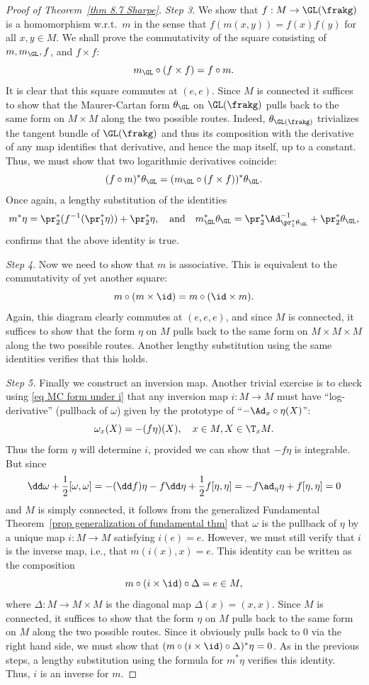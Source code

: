 \begin{proof}[Proof of Theorem~\ref{thm 8.7 Sharpe}]
    \emph{Step 3.} We show that $f:M\to \GL(\frakg)$ is a homomorphism w.r.t.\ $m$ in the sense that $f(m(x,y))=f(x)f(y)$ for all $x,y\in M$. We shall prove the commutativity of the square consisting of $m,m_{\GL},f$, and $f\times f$:
    \[m_{\GL}\circ (f\times f)=f\circ m.\]
    It is clear that this square commutes at $(e,e)$. Since $M$ is connected it suffices to show that the Maurer-Cartan form $\theta_{\GL}$ on $\GL(\frakg)$ pulls back to the same form on $M\times M$ along the two possible routes. Indeed, $\theta_{\GL(\frakg)}$ trivializes the tangent bundle of $\GL(\frakg)$ and thus its composition with the derivative of any map identifies that derivative, and hence the map itself, up to a constant. Thus, we must show that two logarithmic derivatives coincide:
    \[(f\circ m)^\ast\theta_{\GL}=(m_{\GL}\circ (f\times f))^\ast \theta_{\GL}.\]
    Once again, a lengthy substitution of the identities
    \[m^\ast\eta=\pr_2^\ast(f^{-1}(\pr_1^\ast\eta))+\pr_2^\ast\eta, \quad \text{and}\quad m_{\GL}^\ast\theta_{\GL}=\pr_2^\ast \Ad^{-1}_{\pr_1^\ast\theta_{\GL}}+\pr_2^\ast \theta_{\GL},\] confirms that the above identity is true.

    \emph{Step 4}. Now we need to show that $m$ is associative. This is equivalent to the commutativity of yet another square:
    \[m\circ (m\times \id)=m\circ (\id\times m).\]
    Again, this diagram clearly commutes at $(e,e,e)$, and since $M$ is connected, it suffices to show that the form $\eta$ on $M$ pulls back to the same form on $M\times M\times M$ along the two possible routes. Another lengthy substitution using the same identities verifies that this holds.

    \emph{Step 5.} Finally we construct an inversion map. Another trivial exercise is to check using \eqref{eq MC form under i} that any inversion map $i:M\to M$ must have ``log-derivative'' (pullback of $\omega$) given by the prototype of ``$-\Ad_x\circ \eta(X)$'':
    \[\omega_x(X)=-(f\eta)(X),\quad x\in M,X\in \T_x M.\]
    Thus the form $\eta$ will determine $i$, provided we can show that $-f\eta$ is integrable. But since
    \[\dd\omega+\frac12[\omega,\omega]=-(\dd f)\eta -f\dd \eta+\frac12 f[\eta,\eta]=-f\ad_\eta\eta +f[\eta,\eta]=0\]
    and $M$ is simply connected, it follows from the generalized Fundamental Theorem~\ref{prop generalization of fundamental thm} that $\omega$ is the pullback of $\eta$ by a unique map $i:M\to M$ satisfying $i(e)=e$. However, we must still verify that $i$ is the inverse map, i.e., that $m(i(x),x)=e$. This identity can be written as the composition
    \[m\circ(i\times\id)\circ\Delta=e\in M,\]
    where $\Delta:M\to M\times M$ is the diagonal map $\Delta(x)=(x,x)$. Since $M$ is connected, it suffices to show that the form $\eta$ on $M$ pulls back to the same form on $M$ along the two possible routes. Since it obviously pulls back to $0$ via the right hand side, we must show that $(m\circ(i\times\id)\circ\Delta)^\ast\eta=0$. As in the previous steps, a lengthy substitution using the formula for $m^\ast\eta$ verifies this identity. Thus, $i$ is an inverse for $m$.


\end{proof}
